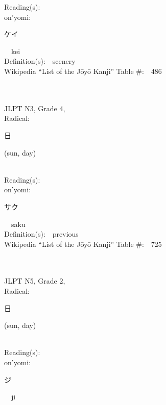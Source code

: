 \begin{multicols}{2}
Reading(s):\ \ \\
{\hspace*{1em}}on'yomi:\ \ \\
{\hspace*{2em}}{\begin{CJK}{UTF8}{min} ケイ \end{CJK}}\ \ kei\ \ \\
Definition(s):\ \ scenery \\
Wikipedia ``List of the J\=oy\=o Kanji'' Table \#:\ \ 486 \\
\ \ \\
{\fontsize{34pt}{40pt}  }\ \ \\  %
{JLPT N3, Grade 4, \\Radical:\ \ {\begin{CJK}{UTF8}{min} 日 \end{CJK}} (sun, day) } \\
Reading(s):\ \ \\
{\hspace*{1em}}on'yomi:\ \ \\
{\hspace*{2em}}{\begin{CJK}{UTF8}{min} サク \end{CJK}}\ \ saku\ \ \\
Definition(s):\ \ previous \\
Wikipedia ``List of the J\=oy\=o Kanji'' Table \#:\ \ 725 \\
\ \ \\
{\fontsize{34pt}{40pt}  }\ \ \\  %
{JLPT N5, Grade 2, \\Radical:\ \ {\begin{CJK}{UTF8}{min} 日 \end{CJK}} (sun, day) } \\
Reading(s):\ \ \\
{\hspace*{1em}}on'yomi:\ \ \\
{\hspace*{2em}}{\begin{CJK}{UTF8}{min} ジ \end{CJK}}\ \ ji\ \ \\

\end{multicols}
